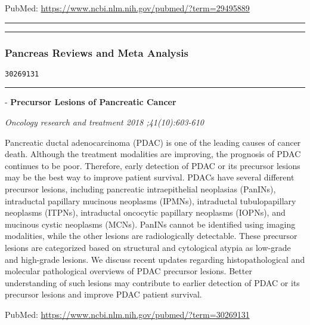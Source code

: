 \documentclass[]{article}
\begin{document}
PubMed: \url{https://www.ncbi.nlm.nih.gov/pubmed/?term=29495889}

{}

{}

\begin{center}\rule{0.5\linewidth}{\linethickness}\end{center}

\begin{center}\rule{0.5\linewidth}{\linethickness}\end{center}

\hypertarget{pancreas-reviews-and-meta-analysis}{%
\subsubsection{Pancreas Reviews and Meta
Analysis}\label{pancreas-reviews-and-meta-analysis}}

\begin{verbatim}
30269131
\end{verbatim}

\begin{center}\rule{0.5\linewidth}{\linethickness}\end{center}

 - \textbf{Precursor Lesions of Pancreatic Cancer}

\emph{Oncology research and treatment 2018 ;41(10):603-610}

Pancreatic ductal adenocarcinoma (PDAC) is one of the leading causes of
cancer death. Although the treatment modalities are improving, the
prognosis of PDAC continues to be poor. Therefore, early detection of
PDAC or its precursor lesions may be the best way to improve patient
survival. PDACs have several different precursor lesions, including
pancreatic intraepithelial neoplasias (PanINs), intraductal papillary
mucinous neoplasms (IPMNs), intraductal tubulopapillary neoplasms
(ITPNs), intraductal oncocytic papillary neoplasms (IOPNs), and mucinous
cystic neoplasms (MCNs). PanINs cannot be identified using imaging
modalities, while the other lesions are radiologically detectable. These
precursor lesions are categorized based on structural and cytological
atypia as low-grade and high-grade lesions. We discuss recent updates
regarding histopathological and molecular pathological overviews of PDAC
precursor lesions. Better understanding of such lesions may contribute
to earlier detection of PDAC or its precursor lesions and improve PDAC
patient survival.

PubMed: \url{https://www.ncbi.nlm.nih.gov/pubmed/?term=30269131}
\end{document}
